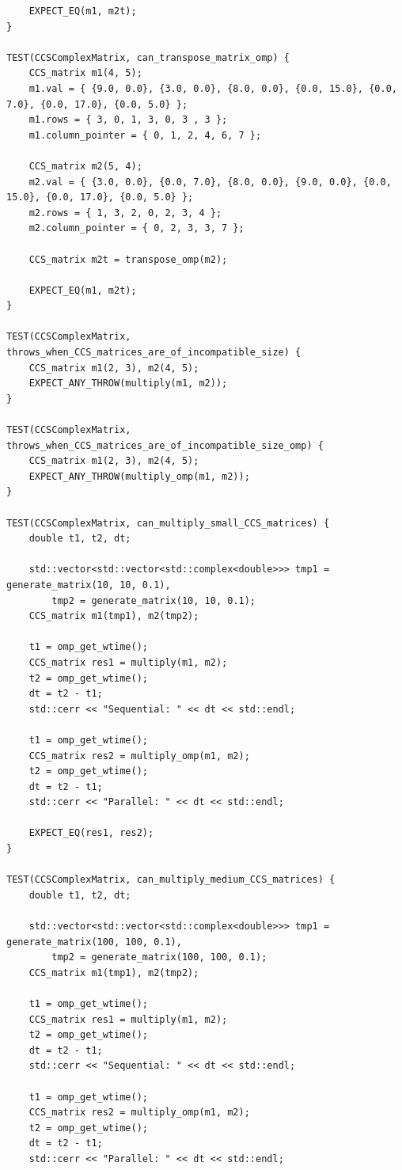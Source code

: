 \documentclass{report}
\begin{document}
\begin{lstlisting}
    EXPECT_EQ(m1, m2t);
}

TEST(CCSComplexMatrix, can_transpose_matrix_omp) {
    CCS_matrix m1(4, 5);
    m1.val = { {9.0, 0.0}, {3.0, 0.0}, {8.0, 0.0}, {0.0, 15.0}, {0.0, 7.0}, {0.0, 17.0}, {0.0, 5.0} };
    m1.rows = { 3, 0, 1, 3, 0, 3 , 3 };
    m1.column_pointer = { 0, 1, 2, 4, 6, 7 };

    CCS_matrix m2(5, 4);
    m2.val = { {3.0, 0.0}, {0.0, 7.0}, {8.0, 0.0}, {9.0, 0.0}, {0.0, 15.0}, {0.0, 17.0}, {0.0, 5.0} };
    m2.rows = { 1, 3, 2, 0, 2, 3, 4 };
    m2.column_pointer = { 0, 2, 3, 3, 7 };

    CCS_matrix m2t = transpose_omp(m2);

    EXPECT_EQ(m1, m2t);
}

TEST(CCSComplexMatrix, throws_when_CCS_matrices_are_of_incompatible_size) {
    CCS_matrix m1(2, 3), m2(4, 5);
    EXPECT_ANY_THROW(multiply(m1, m2));
}

TEST(CCSComplexMatrix, throws_when_CCS_matrices_are_of_incompatible_size_omp) {
    CCS_matrix m1(2, 3), m2(4, 5);
    EXPECT_ANY_THROW(multiply_omp(m1, m2));
}

TEST(CCSComplexMatrix, can_multiply_small_CCS_matrices) {
    double t1, t2, dt;

    std::vector<std::vector<std::complex<double>>> tmp1 = generate_matrix(10, 10, 0.1),
        tmp2 = generate_matrix(10, 10, 0.1);
    CCS_matrix m1(tmp1), m2(tmp2);

    t1 = omp_get_wtime();
    CCS_matrix res1 = multiply(m1, m2);
    t2 = omp_get_wtime();
    dt = t2 - t1;
    std::cerr << "Sequential: " << dt << std::endl;

    t1 = omp_get_wtime();
    CCS_matrix res2 = multiply_omp(m1, m2);
    t2 = omp_get_wtime();
    dt = t2 - t1;
    std::cerr << "Parallel: " << dt << std::endl;

    EXPECT_EQ(res1, res2);
}

TEST(CCSComplexMatrix, can_multiply_medium_CCS_matrices) {
    double t1, t2, dt;

    std::vector<std::vector<std::complex<double>>> tmp1 = generate_matrix(100, 100, 0.1),
        tmp2 = generate_matrix(100, 100, 0.1);
    CCS_matrix m1(tmp1), m2(tmp2);

    t1 = omp_get_wtime();
    CCS_matrix res1 = multiply(m1, m2);
    t2 = omp_get_wtime();
    dt = t2 - t1;
    std::cerr << "Sequential: " << dt << std::endl;

    t1 = omp_get_wtime();
    CCS_matrix res2 = multiply_omp(m1, m2);
    t2 = omp_get_wtime();
    dt = t2 - t1;
    std::cerr << "Parallel: " << dt << std::endl;


\end{lstlisting}
\end{document}
